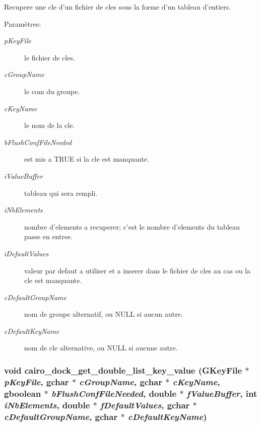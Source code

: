 Recupere une cle d'un fichier de cles sous la forme d'un tableau d'entiers. \begin{Desc}
\item[Paramètres:]
\begin{description}
\item[{\em pKeyFile}]le fichier de cles. \item[{\em cGroupName}]le com du groupe. \item[{\em cKeyName}]le nom de la cle. \item[{\em bFlushConfFileNeeded}]est mis a TRUE si la cle est manquante. \item[{\em iValueBuffer}]tableau qui sera rempli. \item[{\em iNbElements}]nombre d'elements a recuperer; c'est le nombre d'elements du tableau passe en entree. \item[{\em iDefaultValues}]valeur par defaut a utiliser et a inserer dans le fichier de cles au cas ou la cle est manquante. \item[{\em cDefaultGroupName}]nom de groupe alternatif, ou NULL si aucun autre. \item[{\em cDefaultKeyName}]nom de cle alternative, ou NULL si aucune autre. \end{description}
\end{Desc}
\subsubsection{\setlength{\rightskip}{0pt plus 5cm}void cairo\_\-dock\_\-get\_\-double\_\-list\_\-key\_\-value (GKeyFile $\ast$ {\em pKeyFile}, gchar $\ast$ {\em cGroupName}, gchar $\ast$ {\em cKeyName}, gboolean $\ast$ {\em bFlushConfFileNeeded}, double $\ast$ {\em fValueBuffer}, int {\em iNbElements}, double $\ast$ {\em fDefaultValues}, gchar $\ast$ {\em cDefaultGroupName}, gchar $\ast$ {\em cDefaultKeyName})}\label{cairo-dock-config_8h_af7a7a07b316b4cfa0d61b782de4f603}


